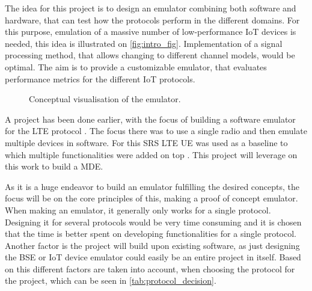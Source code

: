 The idea for this project is to design an emulator combining both software and hardware, that can test how the protocols perform in the different domains. For this purpose, emulation of a massive number of low-performance \gls{IoT} devices is needed, this idea is illustrated on \autoref{fig:intro_fig}. Implementation of a signal processing method, that allows changing to different channel models, would be optimal. The aim is to provide a customizable emulator, that evaluates performance metrics for the different \gls{IoT} protocols. 

\begin{figure}[H]
\centering
\resizebox{0.5\textwidth}{!}{
}
\caption{Conceptual visualisation of the emulator.}
\label{fig:intro_fig}
\end{figure}

A project has been done earlier, with the focus of building a software emulator for the LTE protocol \citep{thesis_report}. The focus there was to use a single radio and then emulate multiple devices in software. For this SRS LTE UE was used as a baseline to which multiple functionalities were added on top \citep{thesis_report}. This project will leverage on this work to build a \gls{MDE}.

As it is a huge endeavor to build an emulator fulfilling the desired concepts, the focus will be on the core principles of this, making a proof of concept emulator. When making an emulator, it generally only works for a single protocol. Designing it for several protocols would be very time consuming and it is chosen that the time is better spent on developing functionalities for a single protocol. Another factor is the project will build upon existing software, as just designing the \gls{BSE} or \gls{IoT} device emulator could easily be an entire project in itself. Based on this different factors are taken into account, when choosing the protocol for the project, which can be seen in \autoref{tab:protocol_decision}.

